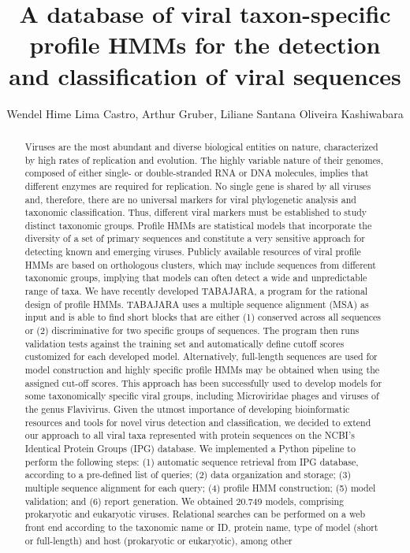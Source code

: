 \documentclass[twoside]{article}
\title{\vspace{-15mm}\fontsize{24pt}{10pt}\selectfont\textbf{ A database of viral taxon-specific profile HMMs for the detection and classification of viral sequences }} %
\author{ Wendel Hime Lima Castro,  Arthur Gruber,  Liliane Santana Oliveira Kashiwabara }
\affil{ UNIVERSIDADE TECNOL\'OGICA FEDERAL DO PARAN\'A,  UNIVERSIDADE DE S\~AO PAULO }
\date{}
\begin{document}
  
  
  \maketitle %
  
  
  \thispagestyle{fancy} %
  
  
  \begin{abstract}
  Viruses are the most abundant and diverse biological entities on nature,  characterized by high rates of replication and evolution. The highly variable nature of their genomes,  composed of either single- or double-stranded RNA or DNA molecules,  implies that different enzymes are required for replication. No single gene is shared by all viruses and,  therefore,  there are no universal markers for viral phylogenetic analysis and taxonomic classification. Thus,  different viral markers must be established to study distinct taxonomic groups. Profile HMMs are statistical models that incorporate the diversity of a set of primary sequences and constitute a very sensitive approach for detecting known and emerging viruses. Publicly available resources of viral profile HMMs are based on orthologous clusters,  which may include sequences from different taxonomic groups,  implying that models can often detect a wide and unpredictable range of taxa. We have recently developed TABAJARA,  a program for the rational design of profile HMMs. TABAJARA uses a multiple sequence alignment (MSA) as input and is able to find short blocks that are either (1) conserved across all sequences or (2) discriminative for two specific groups of sequences. The program then runs validation tests against the training set and automatically define cutoff scores customized for each developed model. Alternatively,  full-length sequences are used for model construction and highly specific profile HMMs may be obtained when using the assigned cut-off scores. This approach has been successfully used to develop models for some taxonomically specific viral groups,  including Microviridae phages and viruses of the genus Flavivirus. Given the utmost importance of developing bioinformatic resources and tools for novel virus detection and classification,  we decided to extend our approach to all viral taxa represented with protein sequences on the NCBI’s Identical Protein Groups (IPG) database. We implemented a Python pipeline to perform the following steps: (1) automatic sequence retrieval from IPG database,  according to a pre-defined list of queries; (2) data organization and storage; (3) multiple sequence alignment for each query; (4) profile HMM construction; (5) model validation; and (6) report generation. We obtained 20.749 models,  comprising prokaryotic and eukaryotic viruses. Relational searches can be performed on a web front end according to the taxonomic name or ID,  protein name,  type of model (short or full-length) and host (prokaryotic or eukaryotic),  among other 
\end{abstract}
\end{document}
